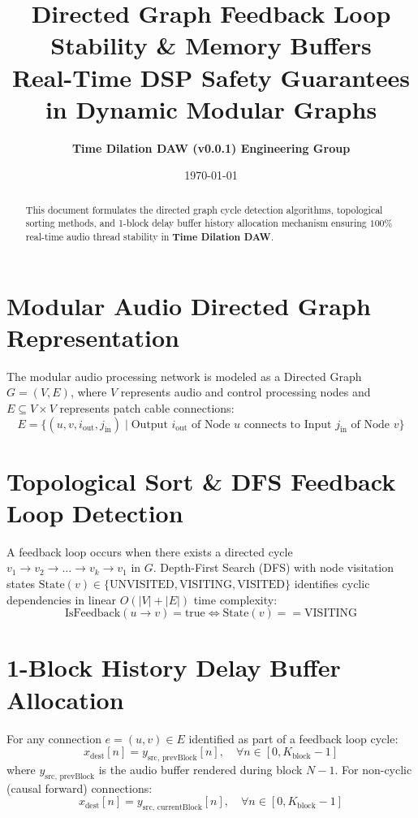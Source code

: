 \documentclass[11pt,a4paper]{article}
\title{\textbf{\Huge Directed Graph Feedback Loop Stability \& Memory Buffers}\\[0.5em]
\Large Real-Time DSP Safety Guarantees in Dynamic Modular Graphs}
\author{\textbf{Time Dilation DAW (v0.0.1) Engineering Group}}
\date{\today}
\begin{document}
\maketitle

\begin{abstract}
This document formulates the directed graph cycle detection algorithms, topological sorting methods, and 1-block delay buffer history allocation mechanism ensuring $100\%$ real-time audio thread stability in \textbf{Time Dilation DAW}.
\end{abstract}

\section{Modular Audio Directed Graph Representation}
The modular audio processing network is modeled as a Directed Graph $G = (V, E)$, where $V$ represents audio and control processing nodes and $E \subseteq V \times V$ represents patch cable connections:
\begin{equation}
E = \{ (u, v, i_{\text{out}}, j_{\text{in}}) \mid \text{Output } i_{\text{out}} \text{ of Node } u \text{ connects to Input } j_{\text{in}} \text{ of Node } v \}
\end{equation}

\section{Topological Sort \& DFS Feedback Loop Detection}
A feedback loop occurs when there exists a directed cycle $v_1 \to v_2 \to \dots \to v_k \to v_1$ in $G$.
Depth-First Search (DFS) with node visitation states $\text{State}(v) \in \{\text{UNVISITED}, \text{VISITING}, \text{VISITED}\}$ identifies cyclic dependencies in linear $O(|V| + |E|)$ time complexity:
\begin{equation}
\text{IsFeedback}(u \to v) = \text{true} \iff \text{State}(v) == \text{VISITING}
\end{equation}

\section{1-Block History Delay Buffer Allocation}
For any connection $e = (u, v) \in E$ identified as part of a feedback loop cycle:
\begin{equation}
x_{\text{dest}}[n] = y_{\text{src, prevBlock}}[n], \quad \forall n \in [0, K_{\text{block}}-1]
\end{equation}
where $y_{\text{src, prevBlock}}$ is the audio buffer rendered during block $N-1$.
For non-cyclic (causal forward) connections:
\begin{equation}
x_{\text{dest}}[n] = y_{\text{src, currentBlock}}[n], \quad \forall n \in [0, K_{\text{block}}-1]
\end{equation}
\end{document}
